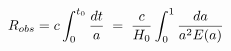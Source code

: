 \documentclass[preview]{standalone}
\begin{document}
\begin{align*}
\special{dvisvgm:raw <g id='unique000'>}R_{obs} = c\int_0^{t_0}\frac{dt}{a}\;=\;\frac{c}{H_0}\int_0^1 \frac{da}{a^2 E(a)}\special{dvisvgm:raw </g>}
\end{align*}
\end{document}
